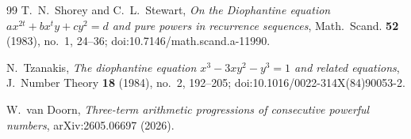 \documentclass[11pt]{article}
\theoremstyle{remark}
\begin{document}
\begin{thebibliography}{99}
 T.~N.~Shorey and C.~L.~Stewart, \emph{On the Diophantine equation $ax^{2t}+bx^ty+cy^2=d$ and pure powers in recurrence sequences}, Math.\ Scand. \textbf{52} (1983), no.~1, 24--36; doi:10.7146/math.scand.a-11990.

 N.~Tzanakis, \emph{The diophantine equation $x^3-3xy^2-y^3=1$ and related equations}, J.\ Number Theory \textbf{18} (1984), no.~2, 192--205; doi:10.1016/0022-314X(84)90053-2.

 W.~van Doorn, \emph{Three-term arithmetic progressions of consecutive powerful numbers}, arXiv:2605.06697 (2026).

\end{thebibliography}
\end{document}
